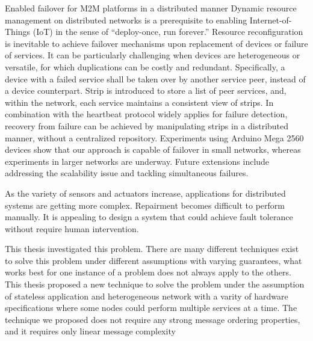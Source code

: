 \begin{abstractEN}

Enabled failover for M2M platforms in a distributed manner
Dynamic resource management on distributed networks is a prerequisite to
enabling Internet-of-Things (IoT) in the sense of “deploy-once, run forever.”
Resource reconfiguration is inevitable to achieve failover mechanisms upon
replacement of devices or failure of services. It can be particularly
challenging when devices are heterogeneous or versatile, for which duplications
can be costly and redundant. Specifically, a device with a failed service shall
be taken over by another service peer, instead of a device counterpart. Strip is
introduced to store a list of peer services, and, within the network, each
service maintains a consistent view of strips. In combination with the heartbeat
protocol widely applies for failure detection, recovery from failure can be
achieved by manipulating strips in a distributed manner, without a centralized
repository. Experiments using Arduino Mega 2560 devices show that our approach
is capable of failover in small networks, whereas experiments in larger networks
are underway. Future extensions include addressing the scalability issue and
tackling simultaneous failures.

As the variety of sensors and actuators increase, applications for distributed systems are getting more complex. Repairment becomes difficult to perform manually. It is appealing to design a system that could achieve fault tolerance without require human intervention.

This thesis investigated this problem. There are many different techniques exist to solve this problem under different assumptions with varying guarantees, what works best for one instance of a problem does not always apply to the others. This thesis proposed a new technique to solve the problem under the assumption of stateless application and heterogeneous network with a varity of hardware specifications where some nodes could perform multiple services at a time. The technique we proposed does not require any strong message ordering properties, and it requires only linear message complexity


\end{abstractEN}

\begin{comment}

\category{I2.10}{Computing Methodologies}{Artificial Intelligence --
Vision and Scene Understanding}

\terms{System, Policy}

\keywords{Component Architecture Middleware, Fault Tolerance}

\end{comment}
